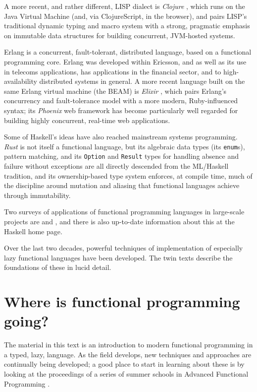 A more recent, and rather different, LISP dialect is \emph{Clojure} \cite{Clojure}, which runs on the Java Virtual Machine (and, via ClojureScript, in the browser), and pairs LISP's traditional dynamic typing and macro system with a strong, pragmatic emphasis on immutable data structures for building concurrent, JVM-hosted systems.

Erlang is a concurrent, fault-tolerant, distributed language, based on a functional programming core. Erlang \cite{progErlang,erlangProg} was developed within Ericsson, and as well as its use in telecoms applications, has applications in the financial sector, and to high-availability distributed systems in general. A more recent language built on the same Erlang virtual machine (the BEAM) is \emph{Elixir} \cite{Elixir}, which pairs Erlang's concurrency and fault-tolerance model with a more modern, Ruby-influenced syntax; its \emph{Phoenix} web framework has become particularly well regarded for building highly concurrent, real-time web applications.

Some of Haskell's ideas have also reached mainstream systems programming. \emph{Rust} \cite{Rust} is not itself a functional language, but its algebraic data types (its \texttt{enum}s), pattern matching, and its \texttt{Option} and \texttt{Result} types for handling absence and failure without exceptions are all directly descended from the ML/Haskell tradition, and its ownership-based type system enforces, at compile time, much of the discipline around mutation and aliasing that functional languages achieve through immutability.

Two surveys of applications of functional programming languages in
large-scale projects are  and , and
there is also up-to-date information about this at the Haskell home page.

Over the last two decades, powerful techniques of implementation of especially
lazy functional languages have been developed. The twin texts
\cite{pj,pj-lester} describe the foundations of these in lucid detail.

\section*{Where is functional programming going?}

The material in this text is an introduction to modern functional
programming in a typed, lazy, language. As the field develops, new
techniques and approaches are continually being developed; a good place
to start in learning about these is by looking at the proceedings of a series of summer
schools in Advanced Functional Programming
\cite{advancedFP,advancedFP2,advancedFP3,advancedFP4,advancedFP5,advancedFP6}. 

